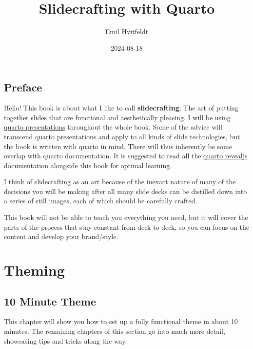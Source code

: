 \documentclass[
  letterpaper,
  DIV=11,
  numbers=noendperiod]{scrreprt}
\title{Slidecrafting with Quarto}
\author{Emil Hvitfeldt}
\date{2024-08-18}
\renewcommand*\contentsname{Table of contents}
\newcommand\contentsname{Table of contents}
\begin{document}
\maketitle

\renewcommand*\contentsname{Table of contents}
{
\hypersetup{linkcolor=}
\setcounter{tocdepth}{2}
\tableofcontents
}


\chapter*{Preface}\label{preface}


Hello! This book is about what I like to call \textbf{slidecrafting};
The art of putting together slides that are functional and aesthetically
pleasing. I will be using \href{https://quarto.org/}{quarto
presentations} throughout the whole book. Some of the advice will
transcend quarto presentations and apply to all kinds of slide
technologies, but the book is written with quarto in mind. There will
thus inherently be some overlap with quarto documentation. It is
suggested to read all the
\href{https://quarto.org/docs/presentations/revealjs/index.html}{quarto
revealjs} documentation alongside this book for optimal learning.

I think of slidecrafting as an art because of the inexact nature of many
of the decisions you will be making after all many slide decks can be
distilled down into a series of still images, each of which should be
carefully crafted.

This book will not be able to teach you everything you need, but it will
cover the parts of the process that stay constant from deck to deck, so
you can focus on the content and develop your brand/style.

\part{Theming}

\chapter{10 Minute Theme}\label{minute-theme}

This chapter will show you how to set up a fully functional theme in
about 10 minutes. The remaining chapters of this section go into much
more detail, showcasing tips and tricks along the way.
\end{document}
